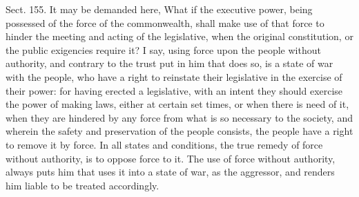 \documentclass[11pt,openany]{book}
\begin{document}
Sect. 155. It may be demanded here, What if the executive power, being possessed of the force of the commonwealth, shall make use of that force to hinder the meeting and acting of the legislative, when the original constitution, or the public exigencies require it? I say, using force upon the people without authority, and contrary to the trust put in him that does so, is a state of war with the people, who have a right to reinstate their legislative in the exercise of their power: for having erected a legislative, with an intent they should exercise the power of making laws, either at certain set times, or when there is need of it, when they are hindered by any force from what is so necessary to the society, and wherein the safety and preservation of the people consists, the people have a right to remove it by force. In all states and conditions, the true remedy of force without authority, is to oppose force to it. The use of force without authority, always puts him that uses it into a state of war, as the aggressor, and renders him liable to be treated accordingly.
\end{document}
